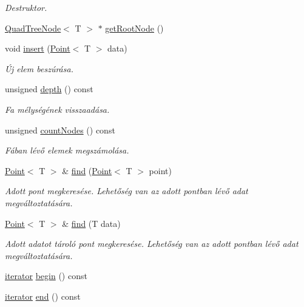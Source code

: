 \begin{DoxyCompactItemize}
\begin{DoxyCompactList}\small\item\em Destruktor. \end{DoxyCompactList}\item 
\hyperlink{class_quad_tree_node}{Quad\-Tree\-Node}$<$ T $>$ $\ast$ \hyperlink{class_quad_tree_abf1956b116f33bbb16a4f6371794162c}{get\-Root\-Node} ()
\item 
void \hyperlink{class_quad_tree_aafef2e05b7f4bd731634574ac3bcdccc}{insert} (\hyperlink{class_point}{Point}$<$ T $>$ data)
\begin{DoxyCompactList}\small\item\em Új elem beszúrása. \end{DoxyCompactList}\item 
unsigned \hyperlink{class_quad_tree_abe41bcda41ff875907e632226bf4d244}{depth} () const 
\begin{DoxyCompactList}\small\item\em Fa mélységének visszaadása. \end{DoxyCompactList}\item 
unsigned \hyperlink{class_quad_tree_acf2697f69e5b6113d2deeb08f8022e40}{count\-Nodes} () const 
\begin{DoxyCompactList}\small\item\em Fában lévő elemek megszámolása. \end{DoxyCompactList}\item 
\hyperlink{class_point}{Point}$<$ T $>$ \& \hyperlink{class_quad_tree_a3f33d10445c05d2a45e472e800bf4207}{find} (\hyperlink{class_point}{Point}$<$ T $>$ point)
\begin{DoxyCompactList}\small\item\em Adott pont megkeresése. Lehetőség van az adott pontban lévő adat megváltoztatására. \end{DoxyCompactList}\item 
\hyperlink{class_point}{Point}$<$ T $>$ \& \hyperlink{class_quad_tree_a66d20874421d3736d491d2280ca0da65}{find} (T data)
\begin{DoxyCompactList}\small\item\em Adott adatot tároló pont megkeresése. Lehetőség van az adott pontban lévő adat megváltoztatására. \end{DoxyCompactList}\item 
\hyperlink{class_quad_tree_1_1iterator}{iterator} \hyperlink{class_quad_tree_a702aaf964efe9b2858dc223b7b810e13}{begin} () const 
\item 
\hyperlink{class_quad_tree_1_1iterator}{iterator} \hyperlink{class_quad_tree_aabea79664dba5f52adef8e977d5e3ffa}{end} () const 
\end{DoxyCompactItemize}
